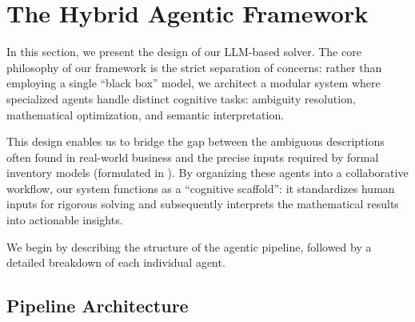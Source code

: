 \section{The Hybrid Agentic Framework}
\label{sec:framework}


In this section, we present the design of our LLM-based solver. The core philosophy of our framework is the strict separation of concerns: rather than employing a single ``black box'' model, we architect a modular system where specialized agents handle distinct cognitive tasks: ambiguity resolution, mathematical optimization, and semantic interpretation.

This design enables us to bridge the gap between the ambiguous descriptions often found in real-world business and the precise inputs required by formal inventory models (formulated in ). By organizing these agents into a collaborative workflow, our system functions as a ``cognitive scaffold'': it standardizes human inputs for rigorous solving and subsequently interprets the mathematical results into actionable insights.

We begin by describing the structure of the agentic pipeline, followed by a detailed breakdown of each individual agent.


\vspace{-.5em}

\subsection{Pipeline Architecture}


